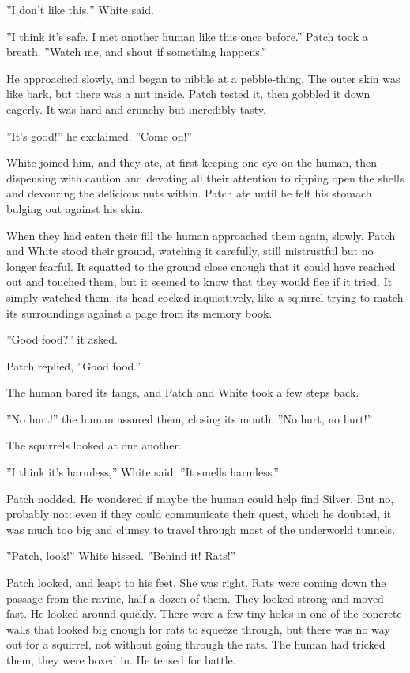 \documentclass[12pt]{book}
\begin{document}
''I don't like this,'' White said.

''I think it's safe. I met another human like this once before.''
Patch took a breath. ''Watch me, and shout if something happens.''

He approached slowly, and began to nibble at a pebble-thing. The outer
skin was like bark, but there was a nut inside. Patch tested it, then
gobbled it down eagerly. It was hard and crunchy but incredibly tasty.

''It's good!'' he exclaimed. ''Come on!''

White joined him, and they ate, at first keeping one eye on the human,
then dispensing with caution and devoting all their attention to
ripping open the shells and devouring the delicious nuts within. Patch
ate until he felt his stomach bulging out against his skin.

When they had eaten their fill the human approached them again,
slowly. Patch and White stood their ground, watching it carefully,
still mistrustful but no longer fearful. It squatted to the ground
close enough that it could have reached out and touched them, but it
seemed to know that they would flee if it tried. It simply watched
them, its head cocked inquisitively, like a squirrel trying to match
its surroundings against a page from its memory book.

''Good food?'' it asked.

Patch replied, ''Good food.''

The human bared its fangs, and Patch and White took a few steps back.

''No hurt!'' the human assured them, closing its mouth. ''No hurt, no
hurt!''

The squirrels looked at one another.

''I think it's harmless,'' White said. ''It smells harmless.''

Patch nodded. He wondered if maybe the human could help find
Silver. But no, probably not: even if they could communicate their
quest, which he doubted, it was much too big and clumsy to travel
through most of the underworld tunnels.

''Patch, look!'' White hissed. ''Behind it! Rats!''

Patch looked, and leapt to his feet. She was right. Rats were coming
down the passage from the ravine, half a dozen of them. They looked
strong and moved fast. He looked around quickly. There were a few tiny
holes in one of the concrete walls that looked big enough for rats to
squeeze through, but there was no way out for a squirrel, not without
going through the rats. The human had tricked them, they were boxed
in. He tensed for battle.
\end{document}
